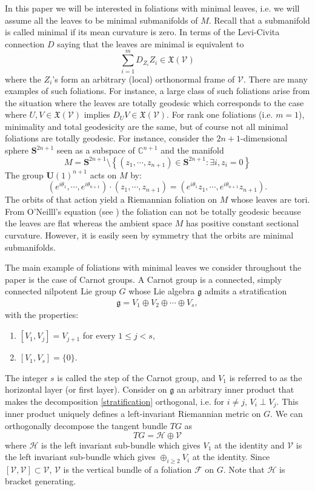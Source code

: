 \documentclass[11pt]{article}
\numberwithin{equation}{section}
\newcommand{\Ho}{\mathcal H}
\newcommand{\V}{\mathcal V}
\begin{document}
In this paper we will be interested in foliations with minimal leaves, i.e. we will assume all the leaves to be minimal submanifolds of $M$. Recall that a submanifold is called minimal if its mean curvature is zero. In terms of the Levi-Civita connection $D$ saying that the leaves are minimal is equivalent to 
\[
\sum_{i=1}^m D_{Z_i}Z_i \in \mathfrak{X}(\V)
\]
where the $Z_i$'s form an arbitrary (local) orthonormal frame of $\V$. There are many examples of such foliations. For instance, a large class of such foliations arise from the situation where the leaves are totally geodesic which corresponds to the case where $U,V \in \mathfrak{X}(\V)$ implies $D_UV \in \mathfrak{X}(\V)$. For rank one foliations (i.e. $m=1$), minimality and total geodesicity are the same, but of course not all minimal foliations are totally geodesic. For instance, consider the $2n+1$-dimensional sphere $\mathbf{S}^{2n+1}$ seen as a subspace of $\mathbb{C}^{n+1}$ and the manifold
\[
M=\mathbf{S}^{2n+1} \setminus \left\{ (z_1,\cdots,z_{n+1}) \in \mathbf{S}^{2n+1} : \exists i, z_i=0  \right\}
\]
The group $\mathbf{U}(1)^{n+1}$ acts on $M$ by:
\[
(e^{i\theta_1},\cdots, e^{i\theta_{n+1}})\cdot (z_1,\cdots,z_{n+1})=(e^{i\theta_1} z_1,\cdots,e^{i\theta_{n+1}} z_{n+1}).
\]
The orbits of that action yield a Riemannian foliation on $M$ whose leaves are tori. From O'Neilll's equation (see \cite[Corollary 1.5.1]{Gromoll}) the foliation can not be totally geodesic because the leaves are flat whereas the ambient space $M$ has positive constant sectional curvature. However, it is easily seen by symmetry that the orbits are minimal submanifolds. 

The main example of foliations with minimal leaves we consider throughout the paper is the case of Carnot groups.  A Carnot group is a connected, simply connected nilpotent Lie group $G$ whose Lie algebra  $\mathfrak{g}$ admits a stratification
\begin{align}\label{stratification}
\mathfrak{g} = V_{1} \oplus V_{2} \oplus \cdots \oplus V_{s},
\end{align}
with the properties:
\begin{enumerate}
    \item $[V_{1}, V_{j}] = V_{j+1}$ for every $1 \leq j < s$,
    \item $[V_{1}, V_{s}] = \{0\}$.
\end{enumerate}
The integer $s$ is called the step of the Carnot group, and $V_{1}$ is referred to as the horizontal layer (or first layer). Consider on $\mathfrak{g}$ an arbitrary inner product that makes the decomposition \eqref{stratification} orthogonal, i.e. for $i \neq j$, $V_i \perp V_j$. This inner product uniquely defines a left-invariant Riemannian metric on $G$. We can orthogonally decompose the tangent bundle $TG$ as
\[
TG=\mathcal{H}\oplus \mathcal{V}
\]
where $\Ho$ is the left invariant sub-bundle which gives $V_1$ at the identity and $\V$ is the left invariant sub-bundle which gives $\oplus_{i \ge 2} V_i$ at the identity. Since $[\mathcal{V},\mathcal{V}] \subset \mathcal{V}$, $\V$ is the vertical bundle of a foliation $\mathcal{F}$ on $G$. Note that $\Ho$ is bracket generating.
\end{document}
